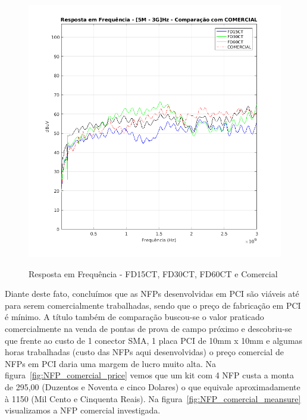 \begin{figure}[htb!]
	\centering 
	\caption{Resposta em Frequência - FD15CT, FD30CT, FD60CT e Comercial}
	\includegraphics[scale=0.7]{./img/FD15CTeCOM}
	\label{fig:FD15CTeCOM}
\end{figure}

Diante deste fato, concluímos que as NFPs desenvolvidas em PCI são viáveis até para serem comercialmente trabalhadas, sendo que o preço de fabricação em PCI é mínimo. A título também de comparação buscou-se o valor praticado comercialmente na venda de pontas de prova de campo próximo e descobriu-se que frente ao custo de 1 conector SMA, 1 placa PCI de 10mm x 10mm e algumas horas trabalhadas (custo das NFPs aqui desenvolvidas) o preço comercial de NFPs em PCI daria uma margem de lucro muito alta. Na figura~\ref{fig:NFP_comercial_price} vemos que um kit com 4 NFP custa a monta de 295,00 (Duzentos e Noventa e cinco Dolares) o que equivale aproximadamente à 1150 (Mil Cento e Cinquenta Reais). Na figura~\ref{fig:NFP_comercial_meansure} visualizamos a NFP comercial investigada.

